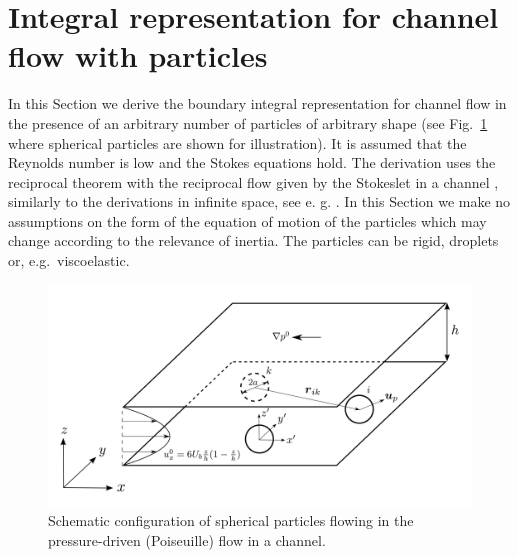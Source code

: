 \section{Integral representation for channel flow with particles}

In this Section we derive the boundary integral representation for channel flow in the presence of an arbitrary number of particles of arbitrary shape (see Fig.\ \ref{fig: setup} where spherical particles are shown for illustration). It is assumed that the Reynolds number is low and the Stokes equations hold. The
derivation uses the reciprocal theorem with the reciprocal flow given by the Stokeslet in a channel \citep{LironMochon}, similarly to the derivations in infinite space, see e. g. \cite{ps}.
In this Section we make no assumptions on the form of the equation of motion of the particles which may change according to the relevance of inertia. The particles can be rigid, droplets or, e.g.\ viscoelastic.

\begin{figure}[t!]
 \begin{center}
\includegraphics[width=.9\columnwidth]{channel_sphere3.pdf}
\end{center}
  \caption{Schematic configuration of spherical particles flowing in the pressure-driven (Poiseuille) flow in a channel.}
 \label{fig: setup}
\end{figure}



